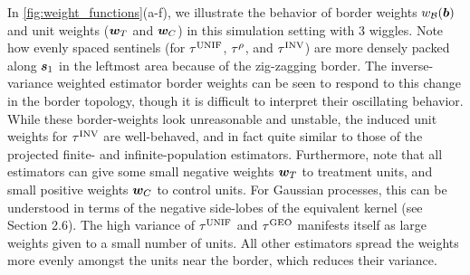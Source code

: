 	In \autoref{fig:weight_functions}(a-f), we illustrate the behavior of border weights \(w_{\mathcal{B}}(\bm{b})\) and unit weights (\(\bm{w}_{T}\) and \(\bm{w}_{C}\)) in this simulation setting with 3 wiggles.
Note how evenly spaced sentinels (for \(\tau^{\mathrm{UNIF}}\), \(\tau^{\rho}\), and \(\tau^{\mathrm{INV}}\)) are more densely packed along \(\bm{s}_1\) in the leftmost area because of the zig-zagging border.
The inverse-variance weighted estimator border weights can be seen to respond to this change in the border topology, though it is difficult to interpret their oscillating behavior.
While these border-weights look unreasonable and unstable, the induced unit weights for \(\tau^{\mathrm{INV}}\) are well-behaved, and in fact quite similar to those of the projected finite- and infinite-population estimators.
Furthermore, note that all estimators can give some small negative weights \(\bm{w}_{T}\) to treatment units, and small positive weights \(\bm{w}_{C}\) to control units.
For Gaussian processes, this can be understood in terms of the negative side-lobes of the equivalent kernel (see \cite{rasmussen2006gaussian} Section 2.6).
The high variance of \(\tau^{\mathrm{UNIF}}\) and \(\tau^{\mathrm{GEO}}\) manifests itself as large weights given to a small number of units.
All other estimators spread the weights more evenly amongst the units near the border, which reduces their variance.
    
